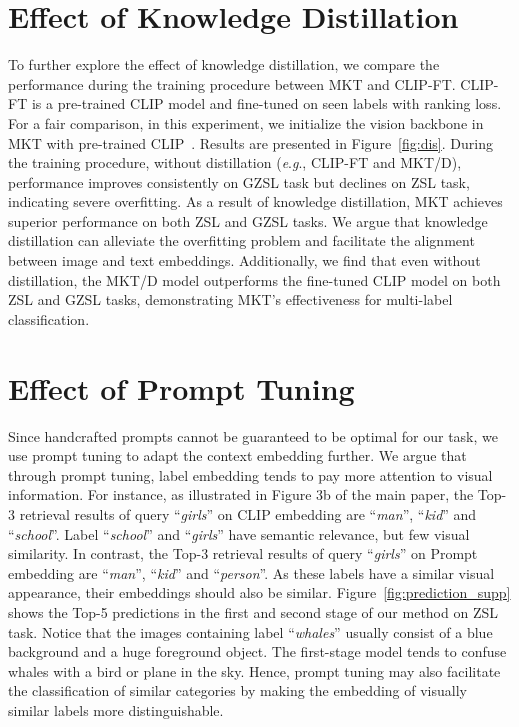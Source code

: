 \documentclass[letterpaper]{article} \usepackage{aaai23}  \usepackage{times}  \usepackage{helvet}  \usepackage{courier}  \usepackage[hyphens]{url}  \usepackage{graphicx} \urlstyle{rm} \def\UrlFont{\rm}  \usepackage{natbib}  \usepackage{caption} \frenchspacing  \setlength{\pdfpagewidth}{8.5in}  \setlength{\pdfpageheight}{11in}
\newcommand{\eg}{\textit{e}.\textit{g}.}
\begin{document}
\section{Effect of Knowledge Distillation}
To further explore the effect of knowledge distillation, we compare the performance during the training procedure between MKT and CLIP-FT.
CLIP-FT is a pre-trained CLIP model and fine-tuned on seen labels with ranking loss.
For a fair comparison, in this experiment, we initialize the vision backbone in MKT with pre-trained CLIP~\cite{clip}. 
Results are presented in Figure~\ref{fig:dis}. 
During the training procedure, without distillation (\eg, CLIP-FT and MKT/D), performance improves consistently on GZSL task but declines on ZSL task, indicating severe overfitting.
As a result of knowledge distillation, MKT achieves superior performance on both ZSL and GZSL tasks.
We argue that knowledge distillation can alleviate the overfitting problem and facilitate the alignment between image and text embeddings.
Additionally, we find that even without distillation, the MKT/D model outperforms the fine-tuned CLIP model on both ZSL and GZSL tasks, demonstrating MKT's effectiveness for multi-label classification.

\section{Effect of Prompt Tuning}
Since handcrafted prompts cannot be guaranteed to be optimal for our task, we use prompt tuning to adapt the context embedding further.
We argue that through prompt tuning, label embedding tends to pay more attention to visual information.
For instance, as illustrated in Figure 3b of the main paper, the Top-3 retrieval results of query ``\textit{girls}'' on CLIP embedding are ``\textit{man}'', ``\textit{kid}'' and ``\textit{school}''.
Label ``\textit{school}'' and ``\textit{girls}'' have semantic relevance, but few visual similarity.
In contrast, the Top-3 retrieval results of query ``\textit{girls}'' on Prompt embedding are ``\textit{man}'', ``\textit{kid}'' and ``\textit{person}''.
As these labels have a similar visual appearance, their embeddings should also be similar.
Figure~\ref{fig:prediction_supp} shows the Top-5 predictions in the first and second stage of our method on ZSL task.
Notice that the images containing label ``\textit{whales}'' usually consist of a blue background and a huge foreground object.
The first-stage model tends to confuse whales with a bird or plane in the sky.
Hence, prompt tuning may also facilitate the classification of similar categories by making the embedding of visually similar labels more distinguishable. 
\end{document}
